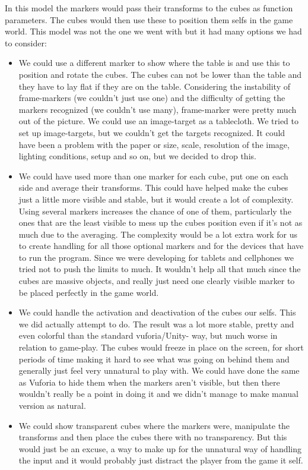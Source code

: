 In this model the markers would pass their transforms to the cubes as function parameters. The cubes would then use these to position them selfs in the game world. This model was not the one we went with but it had many options we had to consider:
\begin{itemize}
  \item We could use a different marker to show where the table is and use this to position and rotate the cubes. The cubes can not be lower than the table and they have to lay flat if they are on the table. Considering the instability of frame-markers (we couldn't just use one) and the difficulty of getting the markers recognized (we couldn't use many), frame-marker were pretty much out of the picture. We could use an image-target as a tablecloth. We tried to set up image-targets, but we couldn't get the targets recognized. It could have been a problem with the paper or size, scale, resolution of the image, lighting conditions, setup and so on, but we decided to drop this.
  \item We could have used more than one marker for each cube, put one on each side and average their transforms. This could have helped make the cubes just a little more visible and stable, but it would create a lot of complexity. Using several markers increases the chance of one of them, particularly the ones that are the least visible to mess up the cubes position even if it's not as much due to the averaging. The complexity would be a lot extra work for us to create handling for all those optional markers and for the devices that have to run the program. Since we were developing for tablets and cellphones we tried not to push the limits to much. It wouldn't help all that much since the cubes are massive objects, and really just need one clearly visible marker to be placed perfectly in the game world.
  \item We could handle the activation and deactivation of the cubes our selfs. This we did actually attempt to do. The result was a lot more stable, pretty and even colorful than the standard vuforia/Unity- way, but much worse in relation to game-play. The cubes would freeze in place on the screen, for short periods of time making it hard to see what was going on behind them and generally just feel very unnatural to play with. We could have done the same as Vuforia to hide them when the markers aren't visible, but then there wouldn't really be a point in doing it and we didn't manage to make manual version as natural. 
  \item We could show transparent cubes where the markers were, manipulate the transforms and then place the cubes there with no transparency. But this would just be an excuse, a way to make up for the unnatural way of handling the input and it would probably just distract the player from the game it self.
\end{itemize}
